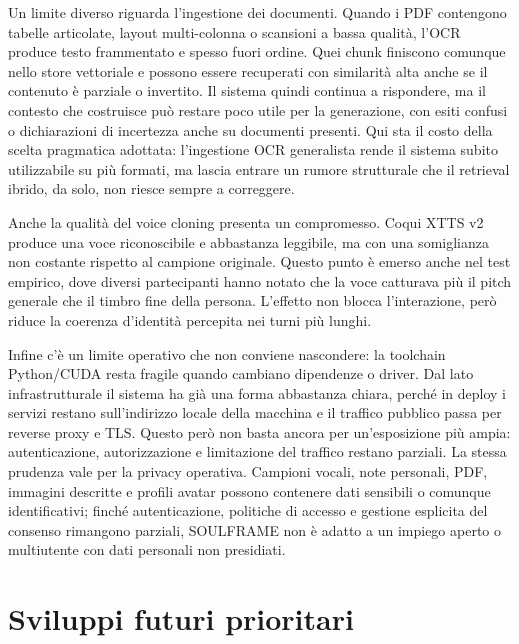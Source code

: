 Un limite diverso riguarda l'ingestione dei documenti. Quando i PDF contengono tabelle articolate, layout multi-colonna o scansioni a bassa qualità, l'OCR produce testo frammentato e spesso fuori ordine. Quei chunk finiscono comunque nello store vettoriale e possono essere recuperati con similarità alta anche se il contenuto è parziale o invertito. Il sistema quindi continua a rispondere, ma il contesto che costruisce può restare poco utile per la generazione, con esiti confusi o dichiarazioni di incertezza anche su documenti presenti. Qui sta il costo della scelta pragmatica adottata: l'ingestione OCR generalista rende il sistema subito utilizzabile su più formati, ma lascia entrare un rumore strutturale che il retrieval ibrido, da solo, non riesce sempre a correggere.

Anche la qualità del voice cloning presenta un compromesso. Coqui XTTS v2 produce una voce riconoscibile e abbastanza leggibile, ma con una somiglianza non costante rispetto al campione originale. Questo punto è emerso anche nel test empirico, dove diversi partecipanti hanno notato che la voce catturava più il pitch generale che il timbro fine della persona. L'effetto non blocca l'interazione, però riduce la coerenza d'identità percepita nei turni più lunghi.

Infine c'è un limite operativo che non conviene nascondere: la toolchain Python/CUDA resta fragile quando cambiano dipendenze o driver. Dal lato infrastrutturale il sistema ha già una forma abbastanza chiara, perché in deploy i servizi restano sull'indirizzo locale della macchina e il traffico pubblico passa per reverse proxy e TLS. Questo però non basta ancora per un'esposizione più ampia: autenticazione, autorizzazione e limitazione del traffico restano parziali. La stessa prudenza vale per la privacy operativa. Campioni vocali, note personali, PDF, immagini descritte e profili avatar possono contenere dati sensibili o comunque identificativi; finché autenticazione, politiche di accesso e gestione esplicita del consenso rimangono parziali, SOULFRAME non è adatto a un impiego aperto o multiutente con dati personali non presidiati.

\section{Sviluppi futuri prioritari}
\label{sec:sviluppi-futuri}

